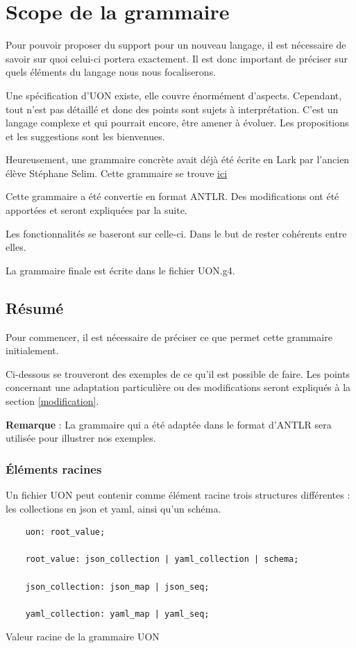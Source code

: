 \documentclass[
    iict, %
    il, %
]{heig-tb}
\begin{document}
\chapter{Scope de la grammaire}\label{grammar scope}
Pour pouvoir proposer du support pour un nouveau langage, il est nécessaire de savoir sur quoi celui-ci portera exactement.
Il est donc important de préciser sur quels éléments du langage nous nous focaliserons.

Une spécification d'UON existe, elle couvre énormément d'aspects. Cependant, tout n'est pas détaillé et donc des points sont sujets à interprétation.
C'est un langage complexe et qui pourrait encore, être amener à évoluer. Les propositions et les suggestions sont les bienvenues.

Heureusement, une grammaire concrète avait déjà été écrite en Lark par l'ancien élève Stéphane Selim.
Cette grammaire se trouve \href{https://github.com/uon-language/uon-parser/tree/master/grammar}{ici}

Cette grammaire a été convertie en format ANTLR. Des modifications ont été apportées et seront expliquées par la suite.

Les fonctionnalités se baseront sur celle-ci. Dans le but de rester cohérents entre elles.

La grammaire finale est écrite dans le fichier UON.g4.

\section{Résumé}
Pour commencer, il est nécessaire de préciser ce que permet cette grammaire initialement.

Ci-dessous se trouveront des exemples de ce qu'il est possible de faire.
Les points concernant une adaptation particulière ou des modifications seront expliqués à la section \ref{modification}.

\textbf{Remarque} : La grammaire qui a été adaptée dans le format d'ANTLR sera utilisée pour illustrer nos exemples.

\subsection{Éléments racines}

Un fichier UON peut contenir comme élément racine trois structures différentes : les collections en json et yaml, ainsi qu'un schéma.

\begin{listing}[!ht]
    \begin{verbatim}
    uon: root_value;

    root_value: json_collection | yaml_collection | schema;

    json_collection: json_map | json_seq;

    yaml_collection: yaml_map | yaml_seq;
    \end{verbatim}
    \caption{Valeur racine de la grammaire UON}
    \label{uon-root-value}
\end{listing}
\end{document}
